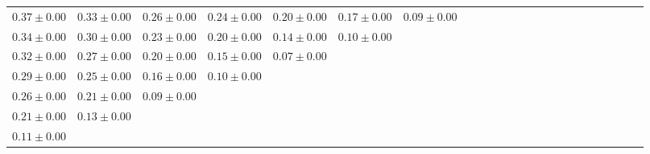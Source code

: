 \begin{table}[ht]
{{\begin{adjustbox}{width=\textwidth}
\begin{tabular}{ccccccccccccccccccccccc}
$0.37 \pm 0.00$ & $0.33 \pm 0.00$ & $0.26 \pm 0.00$ & $0.24 \pm 0.00$ & $0.20 \pm 0.00$ & $0.17 \pm 0.00$ & $0.09 \pm 0.00$ &  &  &  &  &  &  &  &  &  &  &  &  &  &  &  &  \\
$0.34 \pm 0.00$ & $0.30 \pm 0.00$ & $0.23 \pm 0.00$ & $0.20 \pm 0.00$ & $0.14 \pm 0.00$ & $0.10 \pm 0.00$ &  &  &  &  &  &  &  &  &  &  &  &  &  &  &  &  &  \\
$0.32 \pm 0.00$ & $0.27 \pm 0.00$ & $0.20 \pm 0.00$ & $0.15 \pm 0.00$ & $0.07 \pm 0.00$ &  &  &  &  &  &  &  &  &  &  &  &  &  &  &  &  &  &  \\
$0.29 \pm 0.00$ & $0.25 \pm 0.00$ & $0.16 \pm 0.00$ & $0.10 \pm 0.00$ &  &  &  &  &  &  &  &  &  &  &  &  &  &  &  &  &  &  &  \\
$0.26 \pm 0.00$ & $0.21 \pm 0.00$ & $0.09 \pm 0.00$ &  &  &  &  &  &  &  &  &  &  &  &  &  &  &  &  &  &  &  &  \\
$0.21 \pm 0.00$ & $0.13 \pm 0.00$ &  &  &  &  &  &  &  &  &  &  &  &  &  &  &  &  &  &  &  &  &  \\
$0.11 \pm 0.00$ &  &  &  &  &  &  &  &  &  &  &  &  &  &  &  &  &  &  &  &  &  &  \\


\end{tabular}
\end{adjustbox}}}
\end{table}
